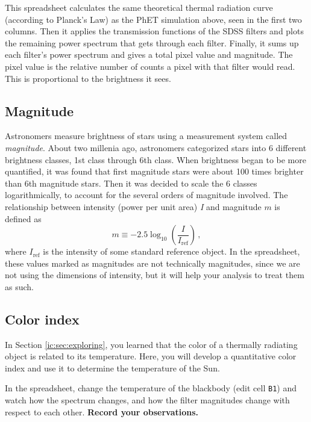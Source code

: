 This spreadsheet calculates the same theoretical thermal radiation curve (according to Planck's Law) as the PhET simulation above, seen in the first two columns. Then it applies the transmission functions of the SDSS filters and plots the remaining power spectrum that gets through each filter. Finally, it sums up each filter's power spectrum and gives a total pixel value and magnitude. The pixel value is the relative number of counts a pixel with that filter would read. This is proportional to the brightness it sees.

\subsection{Magnitude}

Astronomers measure brightness of stars using a measurement system called \textit{magnitude}. About two millenia ago, astronomers categorized stars into 6 different brightness classes, 1st class through 6th class. When brightness began to be more quantified, it was found that first magnitude stars were about 100 times brighter than 6th magnitude stars. Then it was decided to scale the 6 classes logarithmically, to account for the several orders of magnitude involved. The relationship between intensity (power per unit area) \textit{I} and magnitude $m$ is defined as
\begin{equation}
 m \equiv -2.5 \log_{10} \left(\frac{I}{I_\textrm{ref}}\right) \,,
\end{equation}
where $I_\textrm{ref}$ is the intensity of some standard reference object. In the spreadsheet, these values marked as magnitudes are not technically magnitudes, since we are not using the dimensions of intensity, but it will help your analysis to treat them as such.

\subsection{Color index}

In Section \ref{ic:sec:exploring}, you learned that the color of a thermally radiating object is related to its temperature. Here, you will develop a quantitative color index and use it to determine the temperature of the Sun.

\begin{steps}
	\item\label{ic:step:see-thermal} In the spreadsheet, change the temperature of the blackbody (edit cell \texttt{B1}) and watch how the spectrum changes, and how the filter magnitudes change with respect to each other. \textbf{Record your observations.}
\end{steps}
	
